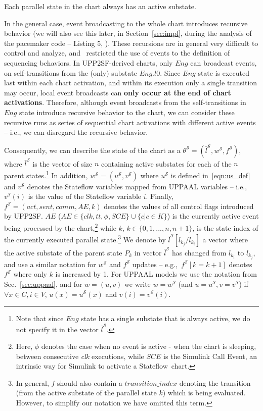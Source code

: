 \begin{proposition}
\label{p1_noinactivechild}
Each parallel state in the chart always has an active substate.
\end{proposition}

In the general case, event broadcasting to the whole chart introduces recursive behavior (we will also see this later, in Section~\ref{sec:impl}, during the analysis of the pacemaker code -- Listing 5, ). These recursions are in general very difficult to control and analyze, and~\cite{SFsem1} restricted the use of events to the definition of sequencing behaviors. 
In UPP2SF-derived charts, only $Eng$ can broadcast events, on self-transitions from the (only) substate $Eng.l0$. Since $Eng$ state is executed last within each chart activation, and within its execution only a single transition may occur, local event broadcasts can \textbf{only occur at the end of chart activations}. Therefore, although event broadcasts from the self-transitions in $Eng$ state introduce recursive behavior to the chart, we can consider these recursive runs as series of sequential chart activations with different active events -- i.e., we can disregard the recursive behavior. 


Consequently, we can describe the state of the chart as a $\theta^\mathcal{S}=(\bar{l}^\mathcal{S},w^\mathcal{S},f^\mathcal{S})$, where $\bar{l}^\mathcal{S}$ is the vector of size $n$ containing active substates for each of the $n$ parent states.\footnote{Note that since $Eng$ state has a single substate that is always active, we do not specify it in the vector $\bar{l}^\mathcal{S}$.} 
In addition, $w^\mathcal{S}=(u^\mathcal{S},v^\mathcal{S})$ where $u^\mathcal{S}$ is defined in~\eqref{eqn:us_def} and $v^\mathcal{S}$ denotes the Stateflow variables mapped from UPPAAL variables -- i.e., $v^\mathcal{S}(i)$ is the value of the Stateflow variable $i$. Finally, $f^\mathcal{S}=(act,sent,comm,AE,k)$ denotes the values of all control flags introduced by UPP2SF. $AE$ ($AE\in\{clk,tt,\phi, SCE\}\cup\{c|c\in K\}$) is the currently active event being processed by the chart,\footnote{Here, $\phi$ denotes the case when no event is active - when the chart is sleeping, between consecutive 
\textit{clk} executions, while $SCE$ is the Simulink Call Event, an intrinsic way for Simulink to activate a Stateflow~chart.} while $k$, $k\in\{0,1,...,n,n+1\}$, is the state index of the currently executed parallel state.\footnote{In general, $f$ should also contain a $transition\_index$ denoting the transition (from the active substate of the parallel state $k$) which is being evaluated. However, to simplify our notation we have omitted this term.} 
We denote by $\bar{l}^\mathcal{S}[l_{k_j}/l_{k_i}]$ a vector where the active substate of the parent state $P_k$ in vector $\bar{l}^\mathcal{S}$ has changed from $l_{k_i}$ to $l_{k_j}$, and use a similar notation for $w^\mathcal{S}$ and $f^\mathcal{S}$ updates -- e.g.,~$f^\mathcal{S}[k=k+1]$ denotes $f^\mathcal{S}$ where only $k$ is increased by 1. 
For  UPPAAL models we use the notation from Sec.~\ref{sec:uppaal}, and for $w=(u,v)$ we write $w=w^{\mathcal{S}}$ (and $u=u^{\mathcal{S}},v=v^{\mathcal{S}}$) if $\forall x\in C, i\in V$, $u(x)=u^\mathcal{S}(x)$ and $v(i)=v^{\mathcal{S}}(i)$.


